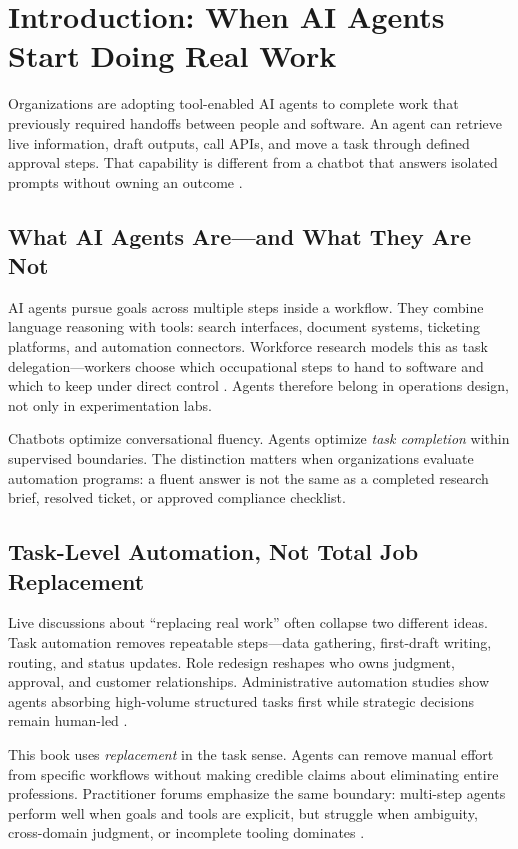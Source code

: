 \section{Introduction: When AI Agents Start Doing Real Work}

Organizations are adopting tool-enabled AI agents to complete work that previously required
handoffs between people and software. An agent can retrieve live information, draft outputs,
call APIs, and move a task through defined approval steps. That capability is different from
a chatbot that answers isolated prompts without owning an outcome \cite{mediumworkflowagents}.

\subsection{What AI Agents Are---and What They Are Not}

AI agents pursue goals across multiple steps inside a workflow. They combine language
reasoning with tools: search interfaces, document systems, ticketing platforms, and
automation connectors. Workforce research models this as task delegation---workers choose
which occupational steps to hand to software and which to keep under direct control
\cite{arxiv2506workagents}. Agents therefore belong in operations design, not only in
experimentation labs.

Chatbots optimize conversational fluency. Agents optimize \emph{task completion} within
supervised boundaries. The distinction matters when organizations evaluate automation
programs: a fluent answer is not the same as a completed research brief, resolved ticket,
or approved compliance checklist.

\subsection{Task-Level Automation, Not Total Job Replacement}

Live discussions about ``replacing real work'' often collapse two different ideas. Task
automation removes repeatable steps---data gathering, first-draft writing, routing, and
status updates. Role redesign reshapes who owns judgment, approval, and customer
relationships. Administrative automation studies show agents absorbing high-volume structured
tasks first while strategic decisions remain human-led \cite{recomaijobroles}.

This book uses \emph{replacement} in the task sense. Agents can remove manual effort from
specific workflows without making credible claims about eliminating entire professions.
Practitioner forums emphasize the same boundary: multi-step agents perform well when goals
and tools are explicit, but struggle when ambiguity, cross-domain judgment, or incomplete
tooling dominates \cite{redditcomplextasks}.

